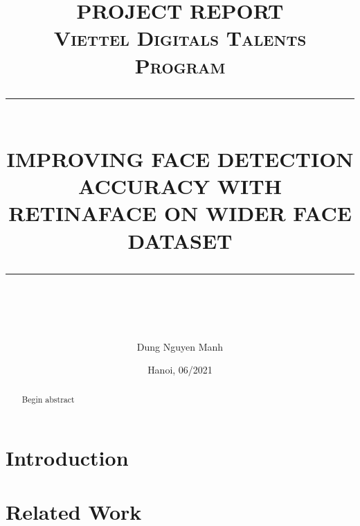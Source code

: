 \documentclass[12pt]{article}
\newcommand{\HRule}[1]{\rule{\linewidth}{#1}}
\begin{document}
\title{ \normalsize \textsc{PROJECT REPORT\\
    Viettel Digitals Talents Program}
\\ [5.0cm]
\HRule{0.5pt} \\
\LARGE \textbf{\uppercase{Improving FACE DETECTION accuracy with RetinaFace 
on WIDER FACE DATASET}}
\HRule{2pt} \\ [0.5 cm]
\normalsize  \vspace*{5\baselineskip}}

\date{
    \large{Hanoi, 06/2021}
}

\author{
    Dung Nguyen Manh \\
}

\newpage
\maketitle

\sectionfont{\scshape}

\newpage
\tableofcontents
\newpage


\begin{abstract}
    Begin abstract
\end{abstract}



\section{Introduction}
\label{sec:intro}


\section{Related Work}
\label{sec:relate}

\end{document}
